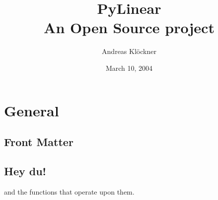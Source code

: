 \documentclass[hyperref]{manual}
\title{PyLinear\\An Open Source project}
\author{Andreas Kl\"ockner}
\date{March 10, 2004}
\begin{document}
\maketitle

\ifhtml
\part*{General}
\chapter*{Front Matter}
\label{front}
\fi


\tableofcontents


\chapter{Hey du!}
and the functions that operate upon them.

\label{part:numerical-python}


\appendix

%
\end{document}
